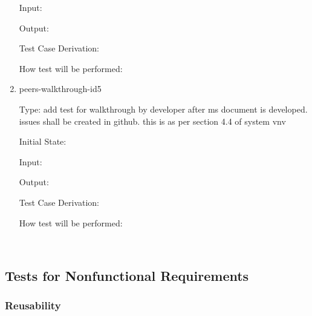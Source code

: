 \documentclass[12pt, titlepage]{article}
\begin{document}
\begin{enumerate}
Input: 
					
Output: 

Test Case Derivation:

How test will be performed: 

\item{peers-walkthrough-id5\\}

Type: add test for walkthrough by developer after ms document is developed. issues shall be created in github. this is as per section 4.4 of system vnv
					
Initial State: 
					
Input: 
					
Output: 

Test Case Derivation:

How test will be performed: 
    
\end{enumerate}

~\newpage

\subsection{Tests for Nonfunctional Requirements}

\subsubsection{Reusability}
		
\end{document}
